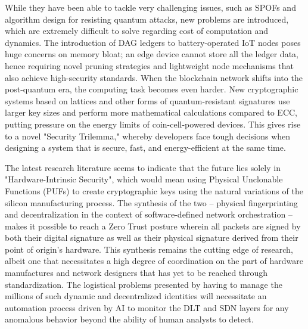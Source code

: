 \documentclass[12pt]{article}
\begin{document}
While they have been able to tackle very challenging issues, such as SPOFs and algorithm design for resisting quantum attacks, new problems are introduced, which are extremely difficult to solve regarding cost of computation and dynamics. The introduction of DAG ledgers to battery-operated IoT nodes poses huge concerns on memory bloat; an edge device cannot store all the ledger data, hence requiring novel pruning strategies and lightweight node mechanisms that also achieve high-security standards. When the blockchain network shifts into the post-quantum era, the computing task becomes even harder. New cryptographic systems based on lattices and other forms of quantum-resistant signatures use larger key sizes and perform more mathematical calculations compared to ECC, putting pressure on the energy limits of coin-cell-powered devices. This gives rise to a novel "Security Trilemma," whereby developers face tough decisions when designing a system that is secure, fast, and energy-efficient at the same time.

The latest research literature seems to indicate that the future lies solely in "Hardware-Intrinsic Security", which would mean using Physical Unclonable Functions (PUFs) to create cryptographic keys using the natural variations of the silicon manufacturing process. The synthesis of the two – physical fingerprinting and decentralization in the context of software-defined network orchestration – makes it possible to reach a Zero Trust posture wherein all packets are signed by both their digital signature as well as their physical signature derived from their point of origin's hardware. This synthesis remains the cutting edge of research, albeit one that necessitates a high degree of coordination on the part of hardware manufactures and network designers that has yet to be reached through standardization. The logistical problems presented by having to manage the millions of such dynamic and decentralized identities will necessitate an automation process driven by AI to monitor the DLT and SDN layers for any anomalous behavior beyond the ability of human analysts to detect.
\end{document}

